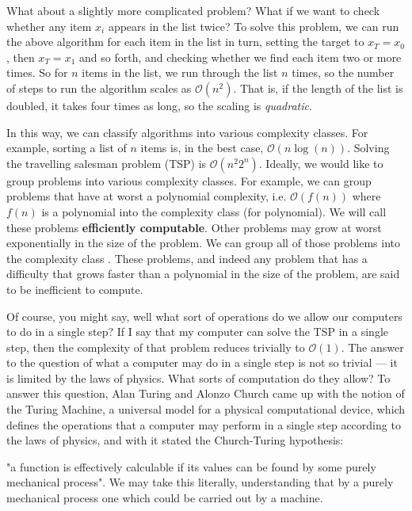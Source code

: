 What about a slightly more complicated problem? What if we want to check whether any item $x_i$ appears
in the list twice? To solve this problem, we can run the above algorithm for each item in the list in turn, setting the
target to $x_T = x_0$, then $x_T = x_1$ and so forth, and checking whether we find each item two or more
times. So for $n$ items in the list, we run through the list $n$ times, so the number of steps to run
the algorithm scales as $\mathcal{O}(n^2)$. That is, if the length of the list is doubled, it takes
four times as long, so the scaling is \emph{quadratic}.

In this way, we can classify algorithms into various complexity classes. For example, sorting a list
of $n$ items is, in the best case, $\mathcal{O}(n \log(n))$. Solving the travelling salesman problem (TSP) is
$\mathcal{O}(n^2 2^n)$. Ideally, we would like to group problems into various complexity classes. For example,
we can group problems that have at worst a polynomial complexity, i.e. $\mathcal{O}\left(f(n)\right)$ where $f(n)$
is a polynomial into the complexity class  (for polynomial). We will call these problems \textbf{efficiently
computable}. Other problems may grow at worst exponentially in the size of the problem. We can group all
of those problems into the complexity class . These problems, and indeed any problem that has a difficulty
that grows faster than a polynomial in the size of the problem, are said to be inefficient to compute.

Of course, you might say, well what sort of operations do we allow our computers to do in a single step?
If I say that my computer can solve the TSP in a single step, then the complexity of that problem reduces trivially to
$\mathcal{O}(1)$. The answer to the question of what a computer may do in a single step is not so trivial --- it is limited
by the laws of physics. What sorts of computation do they allow? To answer this question, Alan Turing and Alonzo Church came
up with the notion of the Turing Machine, a universal model for a physical computational device, which defines the
operations that a computer may perform in a single step according to the laws of physics, and with it stated
the Church-Turing hypothesis:

\begin{displayquote}
  "a function is effectively calculable if its values can be found by some purely mechanical process".
  We may take this literally, understanding that by a purely mechanical process one which could be carried out by a machine.
\end{displayquote}

